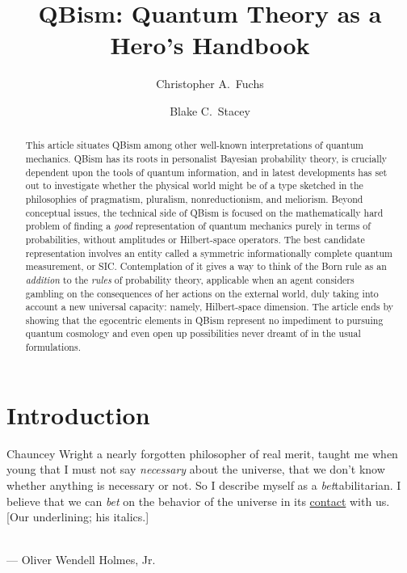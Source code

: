 \documentclass[aps,pra,superscriptaddress,10pt,tightenlines,twocolumn,nofootinbib]{revtex4}
\begin{document}
\title{QBism: Quantum Theory as a Hero's Handbook}
\author{Christopher A.\ Fuchs}
\author{Blake C.\ Stacey}


\begin{abstract}
This article situates QBism among other well-known interpretations of quantum mechanics.  QBism has its roots in personalist Bayesian probability theory, is crucially dependent upon the tools of quantum information, and in latest developments has set out to investigate whether the physical world might be of a type sketched in the philosophies of pragmatism, pluralism, nonreductionism, and meliorism.  Beyond conceptual issues, the technical side of QBism is focused on the mathematically hard problem of finding a {\it good\/} representation of quantum mechanics purely in terms of probabilities, without amplitudes or Hilbert-space operators.  The best candidate representation involves an entity called a symmetric informationally complete quantum measurement, or SIC\@.  Contemplation of it gives a way to think of the Born rule as an {\it addition\/} to the {\it rules\/} of probability theory, applicable when an agent considers gambling on the consequences of her actions on the external world, duly taking into account a new universal capacity:  namely, Hilbert-space dimension.  The article ends by showing that the egocentric elements in QBism represent no impediment to pursuing quantum cosmology and even open up possibilities never dreamt of in the usual formulations.
\end{abstract}

\maketitle


\section{Introduction}

\begin{flushright}
\baselineskip=13pt
\parbox{2.8in}{\baselineskip=13pt\small
Chauncey Wright a nearly forgotten philosopher of real merit, taught me when young that I must not say {\it necessary\/} about the universe, that we don't know whether anything is necessary or not.  So I describe myself as a {\it bet\/}tabilitarian.  I believe that we can {\it bet\/} on the behavior of the universe in its \underline{contact} with us. [Our underlining; his italics.]}
\medskip\\
\small --- Oliver Wendell Holmes, Jr.
\end{flushright}
\end{document}
